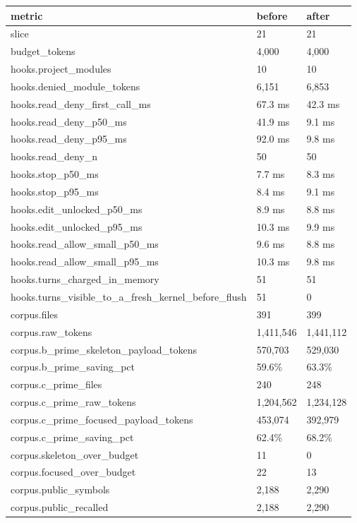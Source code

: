 \documentclass{article}
\begin{document}
\begin{table}[h]
\centering
\begin{tabular}{lll}
\toprule
metric & before & after \\
\midrule
slice & 21 & 21 \\
budget\_tokens & 4,000 & 4,000 \\
hooks.project\_modules & 10 & 10 \\
hooks.denied\_module\_tokens & 6,151 & 6,853 \\
hooks.read\_deny\_first\_call\_ms & 67.3 ms & 42.3 ms \\
hooks.read\_deny\_p50\_ms & 41.9 ms & 9.1 ms \\
hooks.read\_deny\_p95\_ms & 92.0 ms & 9.8 ms \\
hooks.read\_deny\_n & 50 & 50 \\
hooks.stop\_p50\_ms & 7.7 ms & 8.3 ms \\
hooks.stop\_p95\_ms & 8.4 ms & 9.1 ms \\
hooks.edit\_unlocked\_p50\_ms & 8.9 ms & 8.8 ms \\
hooks.edit\_unlocked\_p95\_ms & 10.3 ms & 9.9 ms \\
hooks.read\_allow\_small\_p50\_ms & 9.6 ms & 8.8 ms \\
hooks.read\_allow\_small\_p95\_ms & 10.3 ms & 9.8 ms \\
hooks.turns\_charged\_in\_memory & 51 & 51 \\
hooks.turns\_visible\_to\_a\_fresh\_kernel\_before\_flush & 51 & 0 \\
corpus.files & 391 & 399 \\
corpus.raw\_tokens & 1,411,546 & 1,441,112 \\
corpus.b\_prime\_skeleton\_payload\_tokens & 570,703 & 529,030 \\
corpus.b\_prime\_saving\_pct & 59.6\% & 63.3\% \\
corpus.c\_prime\_files & 240 & 248 \\
corpus.c\_prime\_raw\_tokens & 1,204,562 & 1,234,128 \\
corpus.c\_prime\_focused\_payload\_tokens & 453,074 & 392,979 \\
corpus.c\_prime\_saving\_pct & 62.4\% & 68.2\% \\
corpus.skeleton\_over\_budget & 11 & 0 \\
corpus.focused\_over\_budget & 22 & 13 \\
corpus.public\_symbols & 2,188 & 2,290 \\
corpus.public\_recalled & 2,188 & 2,290 \\

\end{tabular}
\end{table}
\end{document}

